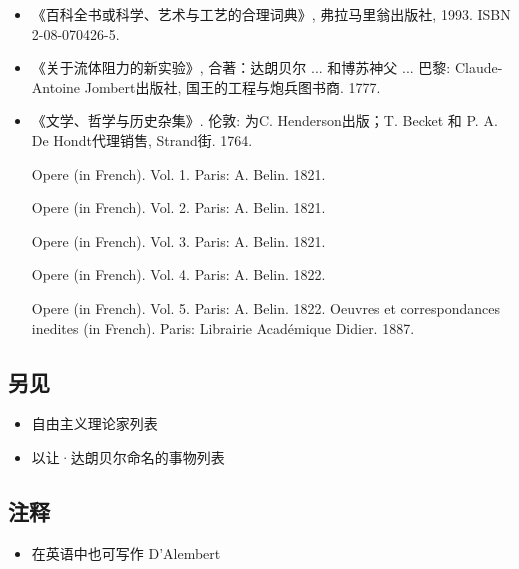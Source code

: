 \begin{itemize}
\item 《百科全书或科学、艺术与工艺的合理词典》, 弗拉马里翁出版社, 1993. ISBN 2-08-070426-5.
\item 《关于流体阻力的新实验》, 合著：达朗贝尔 ... 和博苏神父 ... 巴黎: Claude-Antoine Jombert出版社, 国王的工程与炮兵图书商. 1777.
\item 《文学、哲学与历史杂集》. 伦敦: 为C. Henderson出版；T. Becket 和 P. A. De Hondt代理销售, Strand街. 1764.
\item [Opere] (in French). Vol. 1. Paris: A. Belin. 1821.
\item [Opere] (in French). Vol. 2. Paris: A. Belin. 1821.
\item [Opere] (in French). Vol. 3. Paris: A. Belin. 1821.
\item [Opere] (in French). Vol. 4. Paris: A. Belin. 1822.
\item [Opere] (in French). Vol. 5. Paris: A. Belin. 1822.
Oeuvres et correspondances inedites (in French). Paris: Librairie Académique Didier. 1887.
\end{itemize}
\subsection{另见}
\begin{itemize}
\item 自由主义理论家列表
\item 以让·达朗贝尔命名的事物列表
\end{itemize}
\subsection{注释}
\begin{itemize}
\item 在英语中也可写作 D'Alembert
\end{itemize}
